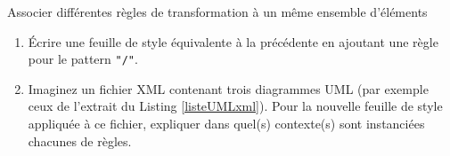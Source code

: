 \begin{frame}[allowframebreaks]{Associer diff\'erentes r\`egles de transformation \`a un m\^eme ensemble d'\'el\'ements}
\framebreak


\framebreak

\begin{exoblock}
\begin{enumerate}
\item \'Ecrire une feuille de style \'equivalente \`a la pr\'ec\'edente en ajoutant une règle pour le pattern \texttt{"/"}.
\item Imaginez un fichier XML contenant trois diagrammes UML (par exemple ceux de l'extrait du Listing \ref{listeUMLxml}). Pour la nouvelle feuille de style appliquée à ce fichier, expliquer dans quel(s) contexte(s) sont instanciées chacunes de r\`egles.
\end{enumerate}
\end{exoblock}

\end{frame}

